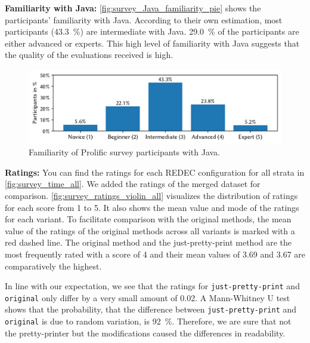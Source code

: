 \documentclass[%
class=scrreprt,
chapterprefix=false,%
open=right,%
twoside=false,%
paper=a4,%
logofile={Logo\_zentral\_farbig\_EN.png},%
thesistype=master,%
UKenglish,%
]{se2thesis}
\theoremstyle{definition}
\newcommand{\rdh}{REDEC\xspace}
\newcommand{\none}{just-pretty-print\xspace} %
\newcommand{\nonet}{\texttt{\none}\xspace} %
\begin{document}
	\textbf{Familiarity with Java:}
	\autoref{fig:survey_Java_familiarity_pie} shows the participants' familiarity with Java. According to their own estimation, most participants (43.3~\%) are intermediate with Java. 29.0~\% of the participants are either advanced or experts. This high level of familiarity with Java suggests that the quality of the evaluations received is high.
	
	\begin{figure}[tb]
		\centering
		\includegraphics[width=\textwidth]{img/survey_java_familiarity_bar.pdf}
		\caption{Familiarity of Prolific survey participants with Java.}
		\label{fig:survey_Java_familiarity_pie}
	\end{figure}
		
	\textbf{Ratings:}
	You can find the ratings for each \rdh configuration for all strata in \autoref{fig:survey_time_all}. We added the ratings of the merged dataset for comparison. \autoref{fig:survey_ratings_violin_all} visualizes the distribution of ratings for each score from 1 to 5. It also shows the mean value and mode of the ratings for each variant. To facilitate comparison with the original methods, the mean value of the ratings of the original methods across all variants is marked with a red dashed line. The original method and the just-pretty-print method are the most frequently rated with a score of 4 and their mean values of 3.69 and 3.67 are comparatively the highest.
	
	In line with our expectation, we see that the ratings for \nonet and \texttt{original} only differ by a very small amount of 0.02. A Mann-Whitney U test shows that the probability, that the difference between \nonet and \texttt{original} is due to random variation, is 92~\%.
	Therefore, we are sure that not the pretty-printer but the modifications caused the differences in readability.
		
\end{document}

